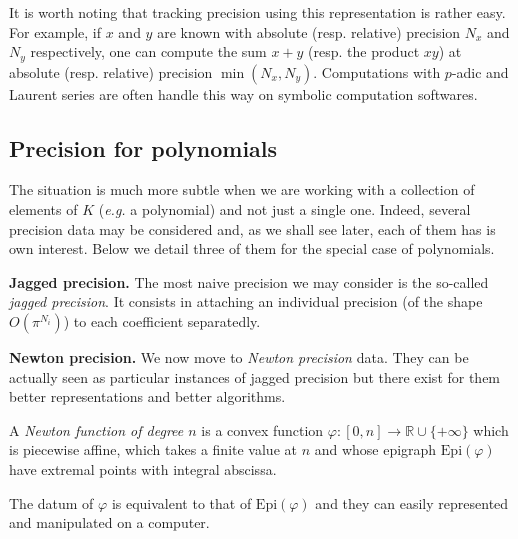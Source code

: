 \documentclass{sig-alternate-2013}
\newcommand{\R}{\mathbb R}
\newcommand{\Epi}{\textrm{Epi}}
\begin{document}
It is worth noting that tracking precision using this representation is 
rather easy. For example, if $x$ and $y$ are known with absolute (resp. 
relative) precision $N_x$ and $N_y$ respectively, one can compute the 
sum $x+y$ (resp. the product $xy$) at absolute (resp. relative) 
precision $\min(N_x,N_y)$. Computations with $p$-adic and Laurent
series are often handle this way on symbolic computation softwares.

\subsection{Precision for polynomials}

The situation is much more subtle when we are working with a collection 
of elements of $K$ (\emph{e.g.} a polynomial) and not just a single one.
Indeed, several precision data may be considered and, as we shall see
later, each of them has is own interest. Below we detail three of them
for the special case of polynomials.

\medskip

\noindent
{\bf Jagged precision.}
The most naive precision we may consider is the so-called \emph{jagged 
precision}. It consists in attaching an individual precision (of the
shape $O(\pi^{N_i})$) to each coefficient separatedly.

\medskip

\noindent
{\bf Newton precision.} 
We now move to \emph{Newton precision} data. They can be actually seen 
as particular instances of jagged precision but there exist for them 
better representations and better algorithms.

\begin{deftn}
A \emph{Newton function of degree $n$} is a convex function 
$\varphi : [0,n] \to \R \cup \{+\infty\}$ which is piecewise affine, 
which takes a finite value at $n$ and whose epigraph $\Epi(\varphi)$ 
have extremal points with integral abscissa.
\end{deftn}

\begin{rem}
The datum of $\varphi$ is equivalent to that of $\Epi(\varphi)$ and they 
can easily represented and manipulated on a computer.
\end{rem}
\end{document}
